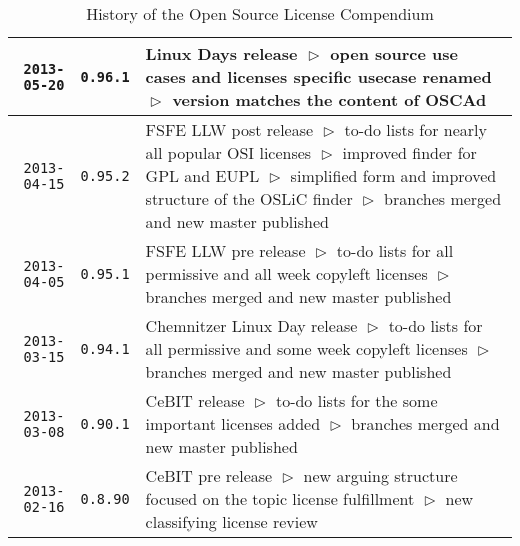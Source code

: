 \begin{table}
\footnotesize
\caption{History of the Open Source License Compendium}
\begin{center}
\begin{tabular}{|r|c|p{10cm}|}
\hline
\hline
    \texttt{2013-05-20}
  & \texttt{0.96.1} 
  & Linux Days release\newline    
    $\vartriangleright$ open source use cases and licenses specific usecase renamed\newline
    $\vartriangleright$ version matches the content of OSCAd\\
\hline
    \texttt{2013-04-15}
  & \texttt{0.95.2} 
  & FSFE LLW post release\newline
    $\vartriangleright$ to-do lists for nearly all popular OSI licenses\newline
    $\vartriangleright$ improved finder for GPL and EUPL\newline
    $\vartriangleright$ simplified form and improved structure of the OSLiC finder\newline    
    $\vartriangleright$ branches merged and new master published\\
\hline
    \texttt{2013-04-05}
  & \texttt{0.95.1} 
  & FSFE LLW pre release\newline
    $\vartriangleright$ to-do lists for all permissive and all week copyleft licenses\newline
    $\vartriangleright$ branches merged and new master published\\
\hline
    \texttt{2013-03-15}
  & \texttt{0.94.1} 
  & Chemnitzer Linux Day release\newline
    $\vartriangleright$ to-do lists for all permissive and some week copyleft licenses\newline
    $\vartriangleright$ branches merged and new master published\\
\hline
    \texttt{2013-03-08}
  & \texttt{0.90.1} 
  & CeBIT release\newline
    $\vartriangleright$ to-do lists for the some important licenses added\newline
    $\vartriangleright$ branches merged and new master published\\
\hline
    \texttt{2013-02-16}
  & \texttt{0.8.90} 
  & CeBIT pre release\newline
    $\vartriangleright$ new arguing structure focused on the topic license fulfillment\newline
    $\vartriangleright$ new classifying license review\newline   

\end{tabular}
\end{center}
\end{table}

